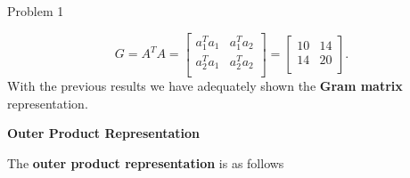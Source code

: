 \begin{problem}{Problem 1}
\begin{highlight}[Solution]
        \begin{equation*}
            G = A^{T}A = 
            \begin{bmatrix}
                a_{1}^{T}a_{1} & a_{1}^{T}a_{2} \\
                a_{2}^{T}a_{1} & a_{2}^{T}a_{2} \\
            \end{bmatrix}
            = 
            \begin{bmatrix}
                10 & 14 \\
                14 & 20 \\
            \end{bmatrix}.
        \end{equation*}
        With the previous results we have adequately shown the \textbf{Gram matrix} representation. \vspace*{1em}

        \noindent \textbf{Outer Product Representation} \vspace*{1em}

        The \textbf{outer product representation} is as follows


\end{highlight}
\end{problem}
